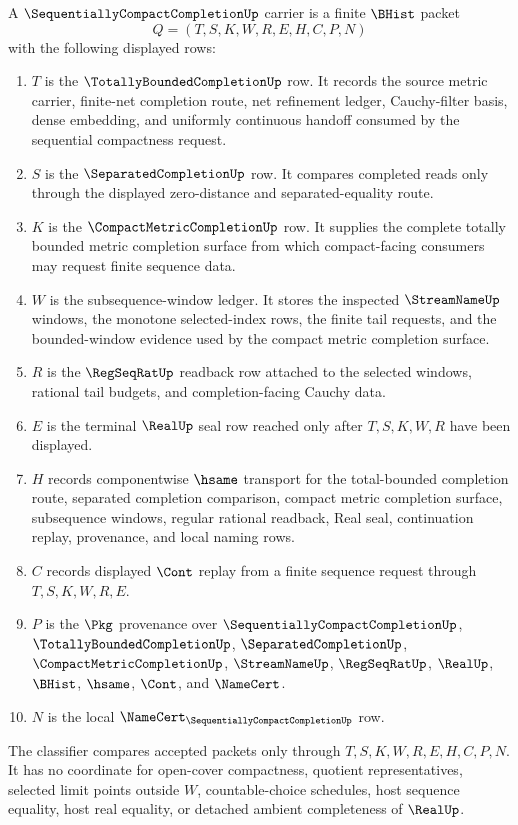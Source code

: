 \begin{definition}
\label{def:sequentially-compact-completion-carrier}
A $\SequentiallyCompactCompletionUp$ carrier is a finite $\BHist$ packet
$$
Q=(T,S,K,W,R,E,H,C,P,N)
$$
with the following displayed rows:
\begin{enumerate}
\item $T$ is the $\TotallyBoundedCompletionUp$ row. It records the source metric carrier, finite-net completion route, net refinement ledger, Cauchy-filter basis, dense embedding, and uniformly continuous handoff consumed by the sequential compactness request.
\item $S$ is the $\SeparatedCompletionUp$ row. It compares completed reads only through the displayed zero-distance and separated-equality route.
\item $K$ is the $\CompactMetricCompletionUp$ row. It supplies the complete totally bounded metric completion surface from which compact-facing consumers may request finite sequence data.
\item $W$ is the subsequence-window ledger. It stores the inspected $\StreamNameUp$ windows, the monotone selected-index rows, the finite tail requests, and the bounded-window evidence used by the compact metric completion surface.
\item $R$ is the $\RegSeqRatUp$ readback row attached to the selected windows, rational tail budgets, and completion-facing Cauchy data.
\item $E$ is the terminal $\RealUp$ seal row reached only after $T,S,K,W,R$ have been displayed.
\item $H$ records componentwise $\hsame$ transport for the total-bounded completion route, separated completion comparison, compact metric completion surface, subsequence windows, regular rational readback, Real seal, continuation replay, provenance, and local naming rows.
\item $C$ records displayed $\Cont$ replay from a finite sequence request through $T,S,K,W,R,E$.
\item $P$ is the $\Pkg$ provenance over $\SequentiallyCompactCompletionUp$, $\TotallyBoundedCompletionUp$, $\SeparatedCompletionUp$, $\CompactMetricCompletionUp$, $\StreamNameUp$, $\RegSeqRatUp$, $\RealUp$, $\BHist$, $\hsame$, $\Cont$, and $\NameCert$.
\item $N$ is the local $\NameCert_{\SequentiallyCompactCompletionUp}$ row.
\end{enumerate}
The classifier compares accepted packets only through $T,S,K,W,R,E,H,C,P,N$. It has no coordinate for open-cover compactness, quotient representatives, selected limit points outside $W$, countable-choice schedules, host sequence equality, host real equality, or detached ambient completeness of $\RealUp$.
\end{definition}

